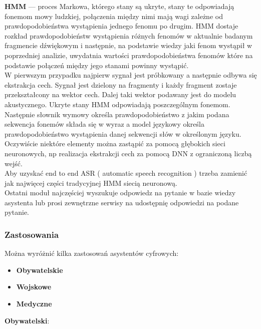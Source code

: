 \textbf{HMM} — proces Markowa, którego stany są ukryte, stany te odpowiadają fonemom mowy ludzkiej, połączenia między nimi mają wagi zależne od prawdopodobieństwa wystąpienia jednego fenomu po drugim. HMM dostaje rozkład prawdopodobieństw wystąpienia różnych fenomów w aktualnie badanym fragmencie dźwiękowym i następnie, na podstawie wiedzy jaki fenom wystąpił w poprzedniej analizie, uwydatnia wartości prawdopodobieństwa fenomów które na podstawie połączeń między jego stanami powinny wystąpić. \\

W pierwszym przypadku najpierw sygnał jest próbkowany a następnie odbywa się ekstrakcja cech. Sygnał jest dzielony na fragmenty i każdy fragment zostaje przekształcony na wektor cech. Dalej taki wektor podawany jest do modelu akustycznego. Ukryte stany HMM odpowiadają poszczególnym fonemom. Następnie słownik wymowy określa prawdopodobieństwo z jakim podana sekwencja fonemów składa się w wyraz a model językowy określa prawdopodobieństwo wystąpienia danej sekwencji słów w określonym języku. \\

Oczywiście niektóre elementy można zastąpić za pomocą głębokich sieci neuronowych, np realizacja ekstrakcji cech za pomocą DNN z ograniczoną liczbą wejść. \\

Aby uzyskać end to end ASR ( automatic speech recognition ) trzeba zamienić jak najwięcej części tradycyjnej HMM siecią neuronową. \\

Ostatni moduł najczęściej wyszukuje odpowiedz na pytanie w bazie wiedzy asystenta lub prosi zewnętrzne serwisy na udostępnię odpowiedzi na podane pytanie. \\

\subsubsection{Zastosowania}

Można wyróżnić kilka zastosowań asystentów cyfrowych: 

\begin{itemize}
	\item \textbf{Obywatelskie} 
	\item \textbf{Wojskowe} 
	\item \textbf{Medyczne} 
\end{itemize}

\textbf{Obywatelski}: 

